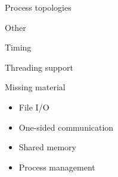 \documentclass[11pt,headernav]{beamer}
\begin{document}
 {Process topologies}

 {Other}

\begin{frame}[containsverbatim]{Timing}
  
\end{frame}

\begin{frame}[containsverbatim]{Threading support}
  
\end{frame}

\begin{frame}{Missing material}
  \begin{itemize}
  \item File I/O
  \item One-sided communication
  \item Shared memory
  \item Process management
  \end{itemize}
\end{frame}

\begin{comment}
  \Level 0 {MPI File I/O}
  \Level 0 {One-sided communication}
  \Level 0 {Shared memory}
  \Level 0 {Process management}
\end{comment}
\end{document}
